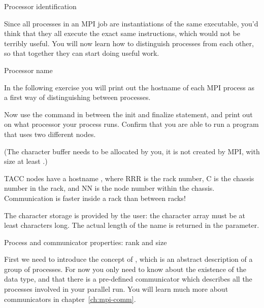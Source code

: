 
 {Processor identification}
\label{sec:rank-size}

Since all processes in an MPI job are instantiations of the same executable,
you'd think that they all execute the exact same instructions,
which would not be terribly useful.
You will now learn how to distinguish
processes from each other, so that together they can start doing
useful work.

 {Processor name}

In the following exercise you will print out the hostname
of each MPI process as a first way of distinguishing between processes.

\begin{exercise}
  \label{ex:procname}
  Now use the command 
  in between the
  init and finalize statement, and print out on what processor your process runs.
  Confirm that you are able to run a program that uses two different nodes.

  (The character buffer needs to be allocated by you, it is not
  created by MPI, with size at
  least .)
\begin{tacc}
TACC nodes have a hostname , where RRR is the rack number, C is the chassis
number in the rack, and NN is the node number within the chassis. Communication
is faster inside a rack than between racks!
\end{tacc}
\end{exercise}

%
The character storage is provided by the user:
the character array must be at least  characters long.
The actual length of the name is returned in the  parameter.

 {Process and communicator properties: rank and size}

First we need to introduce the concept of
, which is an abstract description of a
group of processes. For now you only need to know about the existence
of the  data type, and that there is a
pre-defined communicator  which
describes all the processes involved in your parallel run. You will
learn much more about communicators in chapter~\ref{ch:mpi-comm}.

